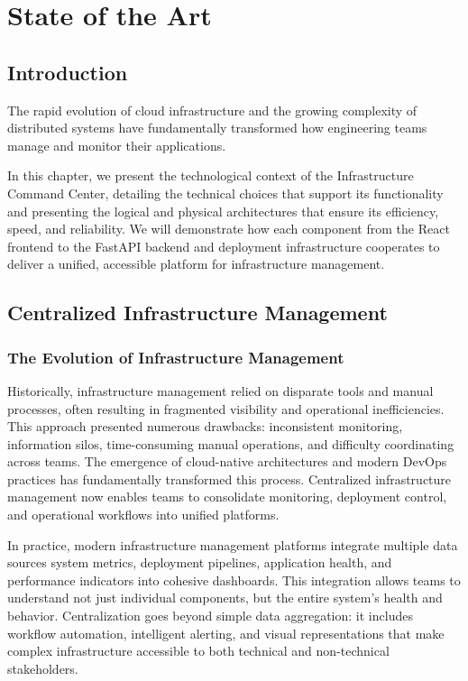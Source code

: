 \chapter{State of the Art}

\section{Introduction}
The rapid evolution of cloud infrastructure and the growing complexity of distributed systems have fundamentally transformed how engineering teams manage and monitor their applications.

In this chapter, we present the technological context of the Infrastructure Command Center, detailing the technical choices that support its functionality and presenting the logical and physical architectures that ensure its efficiency, speed, and reliability. We will demonstrate how each component from the React frontend to the FastAPI backend and deployment infrastructure cooperates to deliver a unified, accessible platform for infrastructure management.

\section{Centralized Infrastructure Management}

\subsection{The Evolution of Infrastructure Management}
Historically, infrastructure management relied on disparate tools and manual processes, often resulting in fragmented visibility and operational inefficiencies. This approach presented numerous drawbacks: inconsistent monitoring, information silos, time-consuming manual operations, and difficulty coordinating across teams. The emergence of cloud-native architectures and modern DevOps practices has fundamentally transformed this process. Centralized infrastructure management now enables teams to consolidate monitoring, deployment control, and operational workflows into unified platforms.

In practice, modern infrastructure management platforms integrate multiple data sources system metrics, deployment pipelines, application health, and performance indicators into cohesive dashboards. This integration allows teams to understand not just individual components, but the entire system's health and behavior. Centralization goes beyond simple data aggregation: it includes workflow automation, intelligent alerting, and visual representations that make complex infrastructure accessible to both technical and non-technical stakeholders.

